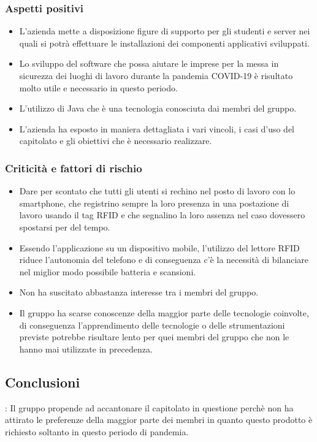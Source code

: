 		\subsubsection{Aspetti positivi}
			\begin{itemize}
				\item L’azienda mette a disposizione figure di supporto per gli studenti e server nei quali si potrà effettuare le installazioni dei componenti applicativi sviluppati.
				\item Lo sviluppo del software che possa aiutare le imprese per la messa in sicurezza dei luoghi di lavoro durante la pandemia COVID-19 è risultato molto utile e necessario in questo periodo.
				\item L’utilizzo di Java che è una tecnologia conosciuta dai membri del gruppo.
				\item L’azienda ha esposto in maniera dettagliata i vari vincoli, i casi d’uso del capitolato e gli obiettivi che è necessario realizzare.
			\end{itemize}
			
		\subsubsection{Criticità e fattori di rischio}
			\begin{itemize}
				\item Dare per scontato che tutti gli utenti si rechino nel posto di lavoro con lo smartphone, che registrino sempre la loro presenza in una postazione di lavoro usando il tag RFID e che segnalino la loro assenza nel caso dovessero spostarsi per del tempo.
				\item Essendo l’applicazione su un dispositivo mobile, l’utilizzo del lettore RFID riduce l’autonomia del telefono e di conseguenza c’è la necessità di bilanciare nel miglior modo possibile batteria e scansioni.
				\item Non ha suscitato abbastanza interesse tra i membri del gruppo.
				\item Il gruppo ha scarse conoscenze della maggior parte delle tecnologie coinvolte, di conseguenza l’apprendimento delle tecnologie o delle strumentazioni previste potrebbe risultare lento per quei membri del gruppo che non le hanno mai utilizzate in precedenza. 
			\end{itemize}
		\subsection{Conclusioni}:
			Il gruppo propende ad accantonare il capitolato in questione perchè non ha attirato le preferenze della maggior parte dei membri in quanto questo prodotto è richiesto soltanto in questo periodo di pandemia.
\newpage
				

